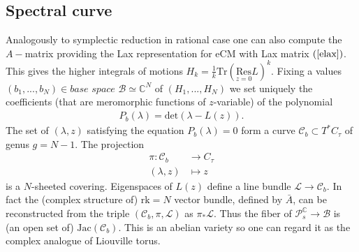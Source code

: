 \documentclass[12pt]{article}
\numberwithin{equation}{section}
\theoremstyle{definition}
\begin{document}
\subsection{Spectral curve}
Analogously to symplectic reduction in rational case one can also compute the $A-$matrix providing the Lax representation for eCM with Lax matrix $(\ref{elax})$. This gives the higher integrals of motions $H_k = \frac{1}{k} \mathrm{Tr} (\underset{z = 0}{\mathrm{Res}} L)^{k}$. Fixing a values $(b_1, ..., b_N ) \in \textit{base space }\mathcal{B} \simeq \mathbb{C}^N$ of $(H_1, ..., H_N )$ we set uniquely the coefficients (that are meromorphic functions of $z$-variable) of the polynomial
\begin{align*}
    P_{b}(\lambda) = \mathrm{det} (\lambda - L(z)).
\end{align*}
The set of $(\lambda , z)$ satisfying the equation $P_{b}(\lambda) = 0$ form a curve $\mathcal{C}_{b} \subset T^{*}C_{\tau}$ of genus $g = N-1$. The projection
\begin{align*}
    \pi: \mathcal{C}_{b} &\rightarrow C_{\tau}\\
    (\lambda, z) &\mapsto z
\end{align*}
is a $N$-sheeted covering. Eigenspaces of $L(z)$ define a line bundle $\mathcal{L} \rightarrow \mathcal{C}_{b}$.
In fact the (complex structure of) $\mathrm{rk} = N$ vector bundle, defined by $\bar{A}$, can be reconstructed from the triple $(\mathcal{C}_{b}, \pi,\mathcal{L})$ as $\pi_{*}\mathcal{L}$. Thus the fiber of $\mathcal{P}_{s}^{\mathbb{C}} \rightarrow \mathcal{B}$ is (an open set of) $\mathrm{Jac}(\mathcal{C}_{b})$. This is an abelian variety so one can regard it as the complex analogue of Liouville torus.
\end{document}
